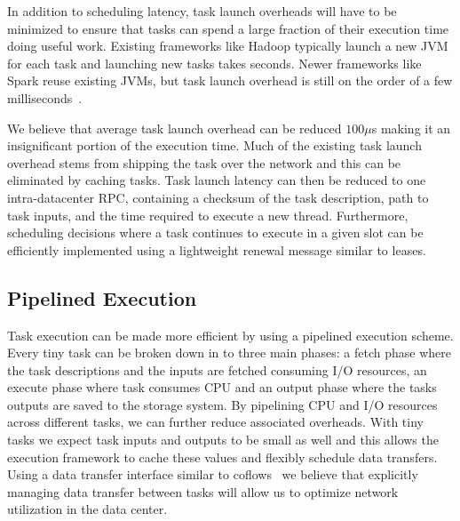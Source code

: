 In addition to scheduling latency, task launch overheads will have to be
minimized to ensure that tasks can spend a large fraction of their execution
time doing useful work. Existing frameworks like Hadoop typically launch a new
JVM for each task and launching new tasks takes  seconds. Newer
frameworks like Spark reuse existing JVMs, but task launch overhead is still on
the order of a few milliseconds~\cite{sparrow}.

We believe that average task launch overhead can be reduced $100 \mu$s making it
an insignificant portion of the execution time. Much of the existing task launch
overhead stems from shipping the task over the network and this can be
eliminated by caching tasks. Task launch latency can then be reduced to one
intra-datacenter RPC, containing a checksum of the task description, path to
task inputs, and the time required to execute a new thread. Furthermore, 
scheduling decisions where a task continues to execute in a given slot can be 
efficiently implemented using a lightweight renewal message similar to leases.\\

\subsection{Pipelined Execution}
\label{sec:pipeline}
Task execution can be made more efficient by using a pipelined execution scheme.
Every tiny task can be broken down in to three main phases: a fetch phase where
the task descriptions and the inputs are fetched consuming I/O resources, an
execute phase where task consumes CPU and an output phase where the tasks
outputs are saved to the storage system. By pipelining CPU and I/O resources
across different tasks, we can further reduce associated overheads. With tiny
tasks we expect task inputs and outputs to be small as well and this allows the
execution framework to cache these values and flexibly schedule data transfers.
Using a data transfer interface similar to coflows~\cite{coflow-hotnets} we
believe that explicitly managing data transfer between tasks will allow us to
optimize network utilization in the data center.

